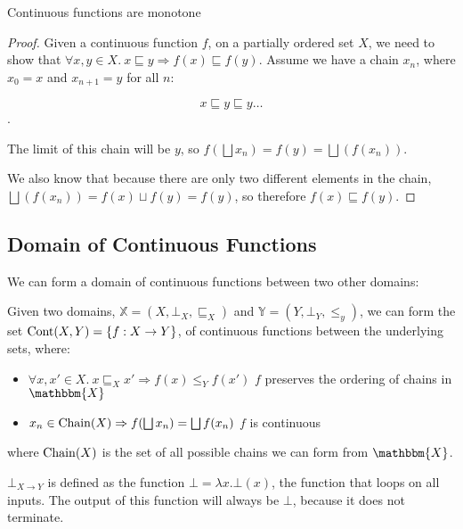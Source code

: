 \vspace{0.25cm}

\begin{thm}\label{mono}
Continuous functions are monotone
\end{thm}

\begin{proof}
Given a continuous function $f$, on a partially ordered set $X$, we need to show that $\forall x,y \in X. \ x \sqsubseteq y \Rightarrow f(x) \sqsubseteq f(y)$.
Assume we have a chain $x_n$, where $x_0 = x$ and $x_{n + 1} = y$ for all $n$:

\[x \sqsubseteq y \sqsubseteq y \dots \] .

The limit of this chain will be $y$, so $f(\bigsqcup x_n) = f(y) = \bigsqcup (f (x_n))$.

We also know that because there are only two different elements in the chain, $\bigsqcup (f (x_n)) = f(x) \sqcup f(y) = f(y)$, so therefore $f(x) \sqsubseteq f(y)$.

\end{proof}

\subsection{Domain of Continuous Functions}\label{cont}

We can form a domain of continuous functions between two other domains:

Given two domains, $\mathbb{X} = (X, \bot_X, \sqsubseteq_X)$ and $\mathbb{Y} = (Y, \bot_Y, \leq_y)$, we can form the set $\operatorname{Cont}(X,Y) =\{ f : X \to Y\}$, of continuous functions between the underlying sets, where:

\begin{itemize}
\item{$\forall x, x' \in X. \ x \sqsubseteq_X x' \Rightarrow f(x) \leq_Y f(x')$ \hspace{1cm} $f$ preserves the ordering of chains in $\mathbbm{X}$}
\item{$x_n \in \operatorname{Chain}(X) \Rightarrow f(\bigsqcup x_n) = \bigsqcup f(x_n)$ \hspace{2cm} $f$ is continuous}
\end{itemize} 

where $\operatorname{Chain}(X)$ is the set of all possible chains we can form from  $\mathbbm{X}$.

$\bot_{X \to Y}$ is defined as the function $\bot = \lambda x. \bot (x)$, the function that loops on all inputs. The output of this function will always be $\bot$, because it does not terminate. 

